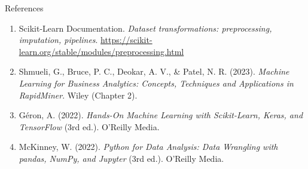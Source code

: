 \documentclass[aspectratio=169,11pt]{beamer}
\begin{document}
\begin{frame}{References}
\begin{enumerate}
  \item Scikit-Learn Documentation. \textit{Dataset transformations: preprocessing, imputation, pipelines}. \url{https://scikit-learn.org/stable/modules/preprocessing.html}
  \item Shmueli, G., Bruce, P. C., Deokar, A. V., \& Patel, N. R. (2023). \textit{Machine Learning for Business Analytics: Concepts, Techniques and Applications in RapidMiner}. Wiley (Chapter 2).
  \item Géron, A. (2022). \textit{Hands-On Machine Learning with Scikit-Learn, Keras, and TensorFlow} (3rd ed.). O'Reilly Media.
  \item McKinney, W. (2022). \textit{Python for Data Analysis: Data Wrangling with pandas, NumPy, and Jupyter} (3rd ed.). O'Reilly Media.
\end{enumerate}
\end{frame}
\end{document}
